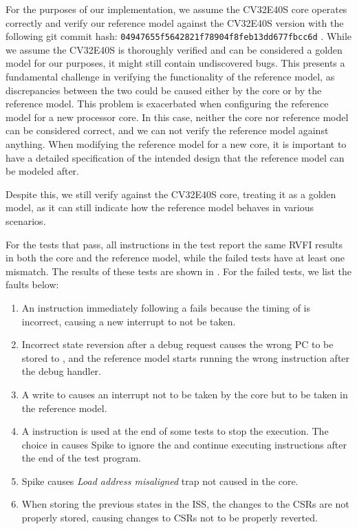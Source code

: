 For the purposes of our implementation, we assume the CV32E40S core operates correctly and verify our reference model against the CV32E40S version with the following git commit hash: \texttt{04947655f5642821f78904f8feb13dd677fbcc6d} \cite{openhwgroupCv32e40s2024}.
While we assume the CV32E40S is thoroughly verified and can be considered a golden model for our purposes, it might still contain undiscovered bugs. This presents a fundamental challenge in verifying the functionality of the reference model, as discrepancies between the two could be caused either by the core or by the reference model. This problem is exacerbated when configuring the reference model for a new processor core. In this case, neither the core nor reference model can be considered correct, and we can not verify the reference model against anything. When modifying the reference model for a new core, it is important to have a detailed specification of the intended design that the reference model can be modeled after.

Despite this, we still verify against the CV32E40S core, treating it as a golden model, as it can still indicate how the reference model behaves in various scenarios.


For the tests that pass, all instructions in the test report the same RVFI results in both the core and the reference model, while the failed tests have at least one mismatch. The results of these tests are shown in . For the failed tests, we list the faults below:
\begin{enumerate}[label=Fault \arabic*]
    \item An  instruction immediately following a  fails because the timing of  is incorrect, causing a new interrupt to not be taken. \label{fault:mretdret}
    \item Incorrect state reversion after a debug request causes the wrong PC to be stored to , and the reference model starts running the wrong instruction after the debug handler.\label{fault:revert}
    \item A write to  causes an interrupt not to be taken by the core but to be taken in the reference model. \label{fault:mstatus_write}
    \item A  instruction is used at the end of some tests to stop the execution. The choice in  causes Spike to ignore the  and continue executing instructions after the end of the test program. \label{fault:wfi}
    \item\label{fault:trap} Spike causes \textit{Load address misaligned} trap not caused in the core.
    \item\label{fault:revert_csr} When storing the previous states in the ISS, the changes to the CSRs are not properly stored, causing changes to CSRs not to be properly reverted.
\end{enumerate}


